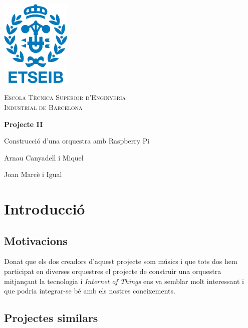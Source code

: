 \documentclass[a4paper]{article}
\begin{document}
\begin{titlepage}
	\centering
	\vspace{1cm}
	\includegraphics[width=0.25\textwidth]{images/etseib}
	\par\vspace{1cm}
	\textsc{ \LARGE Escola Tècnica Superior d'Enginyeria \\[1em] 
		Industrial de Barcelona}
	\par\vspace{2cm}
	\textbf{\LARGE Projecte II}
	\par\vspace{2cm}
	{\Huge Construcció d'una orquestra amb Raspberry Pi}
	\vfill
	\begin{flushright}
		\large
		Arnau Canyadell i Miquel \par
		Joan Marcè i Igual \par
	\end{flushright}
\end{titlepage}

\tableofcontents

\newpage

\section{Introducció}

\subsection{Motivacions}

Donat que els dos creadors d'aquest projecte som músics i que tots dos hem participat en diverses orquestres el projecte de construir una orquestra mitjançant la tecnologia i \emph{Internet of Things} ens va semblar molt interessant i que podria integrar-se bé amb els nostres coneixements.

\subsection{Projectes similars}
\end{document}
